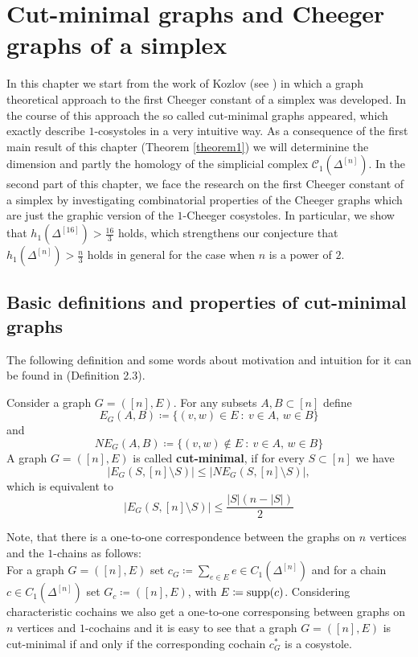 
\chapter{Cut-minimal graphs and Cheeger graphs of a simplex}

\label{Chapter3}

In this chapter we start from the work of Kozlov (see \cite{1}) in which a graph theoretical approach to the first Cheeger constant of a simplex was developed. In the course of this approach the so called cut-minimal graphs appeared, which exactly describe \(1\)-cosystoles in a very intuitive way. As a consequence of the first main result of this chapter (Theorem \ref{theorem1}) we will determinine the dimension and partly the homology of the simplicial complex \(\mathcal{C}_1(\Delta^{[n]})\). In the second part of this chapter, we face the research on the first Cheeger constant of a simplex by investigating combinatorial properties of the Cheeger graphs which are just the graphic version of the \(1\)-Cheeger cosystoles. In particular, we show that \(h_1(\Delta^{[16]})>\frac{16}{3}\) holds, which strengthens our conjecture that \(h_1(\Delta^{[n]})>\frac{n}{3}\) holds in general for the case when \(n\) is a power of \(2\).

\section{Basic definitions and properties of cut-minimal graphs}
The following definition and some words about motivation and intuition for it can be found in \cite{1} (Definition 2.3).

\begin{defi}
Consider a graph \(G=([n],E)\). For any subsets \(A,B\subset [n]\) define
\[
E_G(A,B)\coloneqq \{(v,w)\in E\: :\: v\in A\text{, }w\in B\}
\]
and
\[
NE_G(A,B)\coloneqq \{(v,w)\notin E\: :\: v\in A\text{, }w\in B\}
\]
A graph \(G=([n],E)\) is called \textbf{cut-minimal}, if for every \(S\subset[n]\) we have
\[
|E_G(S,[n]\setminus S)|\leq |NE_G(S,[n]\setminus S)|,
\]
which is equivalent to
\[
|E_G(S,[n]\setminus S)|\leq\frac{|S|(n-|S|)}{2}
\]
\end{defi}

Note, that there is a one-to-one correspondence between the graphs on \(n\) vertices and the \(1\)-chains  as follows:\\
For a graph \(G=([n],E)\) set \(c_G\coloneqq \sum\limits_{e\in E}e\in C_1(\Delta^{[n]})\) and for a chain \(c\in C_1(\Delta^{[n]})\) set \(G_c\coloneqq ([n],E)\), with \(E\coloneqq \mathrm{supp}(c)\). Considering characteristic cochains we also get a one-to-one corresponsing between graphs on \(n\) vertices and \(1\)-cochains and it is easy to see that a graph \(G=([n],E)\) is cut-minimal if and only if the corresponding cochain \(c_G^*\) is a cosystole.

